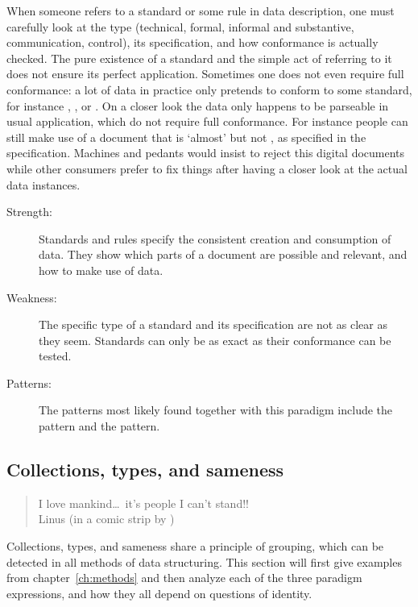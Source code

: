 \noindent When someone refers to a standard or some rule in data description,
one must carefully look at the type (technical, formal, informal and
substantive, communication, control), its specification, and how conformance is
actually checked. The pure existence of a standard and the simple act of
referring to it does not ensure its perfect application. Sometimes one does not
even require full conformance: a lot of data in practice only pretends to
conform to some standard, for instance , , or .
On a closer look the data only happens to be parseable in usual application,
which do not require full conformance. For instance people can still make use
of a document that is `almost'  but not , as
specified in the  specification. Machines and pedants would insist to
reject this digital documents while other consumers prefer to fix things after
having a closer look at the actual data instances.

\begin{description}
\item[Strength:] Standards and rules specify the consistent
 creation and consumption of data. They show which parts of a 
 document are possible and relevant, and how to make use of data.
\item[Weakness:] The specific type of a standard and its specification
  are not as clear as they seem. Standards can only be as exact as their 
  conformance can be tested.
\item[Patterns:] The patterns most likely found together with
  this paradigm include the  pattern and the 
   pattern.
\end{description}


\pagebreak
\subsection{Collections, types, and sameness}
\label{sec:collectionstopic}

\begin{quotation}%
I love mankind\ldots~it's people I can't stand!!\\
\quotationsource Linus (in a comic strip by )
\end{quotation}

\noindent Collections, types, and sameness share a principle of grouping, which
can be detected in all methods of data structuring. This section will first
give examples from chapter~\ref{ch:methods} and then analyze each of the three
paradigm expressions, and how they all depend on questions of identity.

